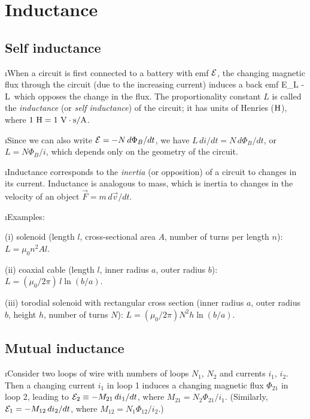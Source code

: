 \section{Inductance}

\subsection{Self inductance}
\bi

\i When a circuit is first connected to a battery 
with emf ${\cal E}$, the changing magnetic flux 
through the circuit (due to the increasing current)
induces a back emf
%
\be
{\cal E}_L \equiv -L\,
\ee
which opposes the change in the flux.
The proportionality constant $L$ is called the 
{\em inductance} (or {\em self inductance}) of
the circuit; it has units of Henries (${\rm H}$), 
where $1~{\rm H} = 1~{\rm V}\cdot{\rm s}/{\rm A}$.

\i Since we can also write ${\cal E}=-N\,{d\Phi_B}/dt$,
we have $L\,{di}/{dt} = N\,{d\Phi_B}/{dt}$, or 
$L = N\Phi_B/i$, which depends only on the
geometry of the circuit.

\i Inductance corresponds to the {\em inertia} 
(or opposition) of
a circuit to changes in its current.
Inductance is analogous to mass, which is inertia 
to changes in the velocity of an object 
$\vec F = m\,d\vec v/dt$.

\i Examples:

(i) solenoid (length $l$, cross-sectional area $A$, number of
turns per length $n$):
$L = \mu_0 n^2 Al$.

(ii) coaxial cable (length $l$, inner radius $a$, outer radius $b$):
$L = (\mu_0/2\pi)\, l\ln(b/a)$.

(iii) torodial solenoid with rectangular cross section (inner radius $a$,
outer radius $b$, height $h$, number of turns $N$):
$L = (\mu_0/2\pi)N^2 h \ln(b/a)$.
\ei
\subsection{Mutual inductance}
\bi

\i Consider two loops of wire with numbers of loops
$N_1$, $N_2$ and currents $i_1$, $i_2$.
Then a changing current $i_1$ in loop 1 induces a changing
magnetic flux $\Phi_{21}$ in loop 2, leading to 
${\cal E}_2 \equiv - M_{21}\, di_1/dt$,
where $M_{21} = N_2 \Phi_{21}/i_1$.
(Similarly, ${\cal E}_1 = - M_{12}\, di_2/dt$,
where $M_{12} = N_1 \Phi_{12}/i_2$.)

